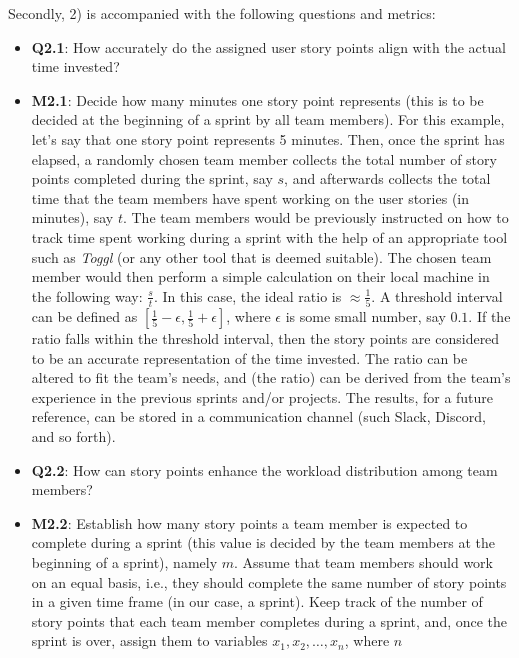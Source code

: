 \documentclass[conference]{IEEEtran}
\begin{document}
Secondly, 2) is accompanied with the following questions and metrics:

\begin{itemize}
  \item \textbf{Q2.1}: How accurately do the assigned user story points align
    with the actual time invested?
  \item \textbf{M2.1}:
    Decide how many minutes one story point represents (this is to be decided
    at the beginning of a sprint by all team members). For this example, let's
    say that one story point represents 5 minutes. Then, once the sprint has
    elapsed, a randomly chosen team member collects the total number of story
    points completed during the sprint, say $s$, and afterwards collects the
    total time that the team members have spent working on the user stories (in
    minutes), say $t$. The team members would be previously instructed on how
    to track time spent working during a sprint with the help of an appropriate
    tool such as \textit{Toggl} (or any other tool that is deemed suitable).
    The chosen team member would then perform a simple calculation on their
    local machine in the following way: $\frac{s}{t}$. In this case, the ideal
    ratio is $\approx \frac{1}{5}$. A threshold interval can be defined as
    $[\frac{1}{5} - \epsilon, \frac{1}{5} + \epsilon]$, where $\epsilon$ is
    some small number, say $0.1$. If the ratio falls within the threshold
    interval, then the story points are considered to be an accurate
    representation of the time invested. The ratio can be altered to fit the
    team's needs, and (the ratio) can be derived from the team's experience in
    the previous sprints and/or projects. The results, for a future reference,
    can be stored in a communication channel (such Slack, Discord, and so
    forth).
  \item \textbf{Q2.2}: How can story points enhance the workload distribution
    among team members?
  \item \textbf{M2.2}: 
    Establish how many story points a team member is expected to complete
    during a sprint (this value is decided by the team members at the beginning
    of a sprint), namely $m$. Assume that team members should work on an equal
    basis, i.e., they should complete the same number of story points in a
    given time frame (in our case, a sprint). Keep track of the number of story
    points that each team member completes during a sprint, and, once the
    sprint is over, assign them to variables $x_1, x_2, \dots, x_n$, where $n$

\end{itemize}
\end{document}
